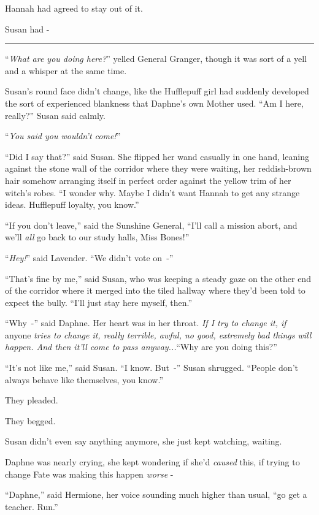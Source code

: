 Hannah had agreed to stay out of it.

Susan had -

\begin{center}\rule{3in}{0.4pt}\end{center}

``\emph{What are you doing here?}'' yelled General Granger, though it was sort of a yell and a whisper at the same time.

Susan's round face didn't change, like the Hufflepuff girl had suddenly developed the sort of experienced blankness that Daphne's own Mother used. ``Am I here, really?'' Susan said calmly.

``\emph{You said you wouldn't come!}''

``Did I say that?'' said Susan. She flipped her wand casually in one hand, leaning against the stone wall of the corridor where they were waiting, her reddish-brown hair somehow arranging itself in perfect order against the yellow trim of her witch's robes. ``I wonder why. Maybe I didn't want Hannah to get any strange ideas. Hufflepuff loyalty, you know.''

``If you don't leave,'' said the Sunshine General, ``I'll call a mission abort, and we'll \emph{all} go back to our study halls, Miss Bones!''

``\emph{Hey!}'' said Lavender. ``We didn't vote on~-''

``That's fine by me,'' said Susan, who was keeping a steady gaze on the other end of the corridor where it merged into the tiled hallway where they'd been told to expect the bully. ``I'll just stay here myself, then.''

``Why~-'' said Daphne. Her heart was in her throat. \emph{If I try to change it, if} anyone \emph{tries to change it, really terrible, awful, no good, extremely bad things will happen. And then it'll come to pass anyway...}``Why are you doing this?''

``It's not like me,'' said Susan. ``I know. But~-'' Susan shrugged. ``People don't always behave like themselves, you know.''

They pleaded.

They begged.

Susan didn't even say anything anymore, she just kept watching, waiting.

Daphne was nearly crying, she kept wondering if she'd \emph{caused} this, if trying to change Fate was making this happen \emph{worse} -

``Daphne,'' said Hermione, her voice sounding much higher than usual, ``go get a teacher. Run.''


